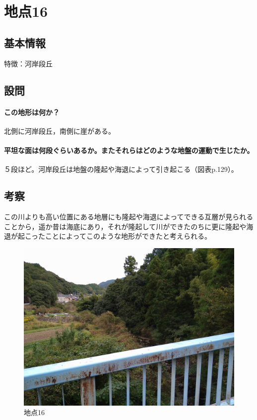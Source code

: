 \documentclass[uplatex,b5paper]{jsreport}
\begin{document}
  \section{地点16}
    \subsection{基本情報}
    特徴：河岸段丘
    \subsection{設問}
      \paragraph{この地形は何か？}
      北側に河岸段丘，南側に崖がある。
      \paragraph{平坦な面は何段ぐらいあるか。またそれらはどのような地盤の運動で生じたか。}
      ５段ほど。河岸段丘は地盤の隆起や海退によって引き起こる（図表p.129）。
    \subsection{考察}
    この川よりも高い位置にある地層にも隆起や海退によってできる互層が見られることから，遥か昔は海底にあり，それが隆起して川ができたのちに更に隆起や海退が起こったことによってこのような地形ができたと考えられる。
  \begin{figure}[h]
    \begin{center}
      \includegraphics[scale=0.12]{files/地学実習/地点16.jpg}
      \caption{地点16}
    \end{center}
  \end{figure}
  \clearpage
\end{document}
